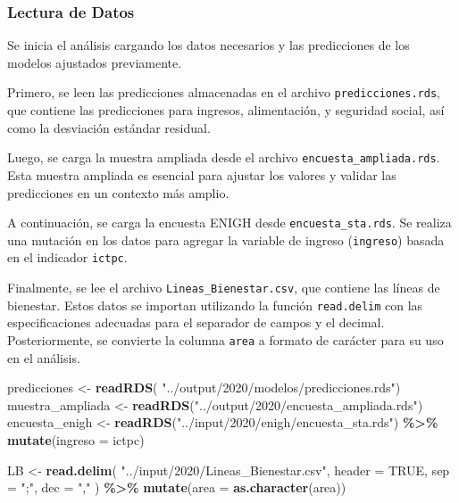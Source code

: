 \documentclass[
  12pt,
]{book}
\newenvironment{Shaded}{\begin{snugshade}}{\end{snugshade}}
\newcommand{\AttributeTok}[1]{\textcolor[rgb]{0.13,0.29,0.53}{#1}}
\newcommand{\ConstantTok}[1]{\textcolor[rgb]{0.56,0.35,0.01}{#1}}
\newcommand{\FunctionTok}[1]{\textcolor[rgb]{0.13,0.29,0.53}{\textbf{#1}}}
\newcommand{\NormalTok}[1]{#1}
\newcommand{\OtherTok}[1]{\textcolor[rgb]{0.56,0.35,0.01}{#1}}
\newcommand{\SpecialCharTok}[1]{\textcolor[rgb]{0.81,0.36,0.00}{\textbf{#1}}}
\newcommand{\StringTok}[1]{\textcolor[rgb]{0.31,0.60,0.02}{#1}}
\begin{document}
\hypertarget{lectura-de-datos-2}{%
\subsubsection*{Lectura de Datos}\label{lectura-de-datos-2}}

Se inicia el análisis cargando los datos necesarios y las predicciones de los modelos ajustados previamente.

Primero, se leen las predicciones almacenadas en el archivo \texttt{predicciones.rds}, que contiene las predicciones para ingresos, alimentación, y seguridad social, así como la desviación estándar residual.

Luego, se carga la muestra ampliada desde el archivo \texttt{encuesta\_ampliada.rds}. Esta muestra ampliada es esencial para ajustar los valores y validar las predicciones en un contexto más amplio.

A continuación, se carga la encuesta ENIGH desde \texttt{encuesta\_sta.rds}. Se realiza una mutación en los datos para agregar la variable de ingreso (\texttt{ingreso}) basada en el indicador \texttt{ictpc}.

Finalmente, se lee el archivo \texttt{Lineas\_Bienestar.csv}, que contiene las líneas de bienestar. Estos datos se importan utilizando la función \texttt{read.delim} con las especificaciones adecuadas para el separador de campos y el decimal. Posteriormente, se convierte la columna \texttt{area} a formato de carácter para su uso en el análisis.

\begin{Shaded}
\begin{Highlighting}[]
\NormalTok{predicciones }\OtherTok{\textless{}{-}} \FunctionTok{readRDS}\NormalTok{( }\StringTok{"../output/2020/modelos/predicciones.rds"}\NormalTok{)}
\NormalTok{muestra\_ampliada }\OtherTok{\textless{}{-}} \FunctionTok{readRDS}\NormalTok{(}\StringTok{"../output/2020/encuesta\_ampliada.rds"}\NormalTok{)}
\NormalTok{encuesta\_enigh }\OtherTok{\textless{}{-}} \FunctionTok{readRDS}\NormalTok{(}\StringTok{"../input/2020/enigh/encuesta\_sta.rds"}\NormalTok{) }\SpecialCharTok{\%\textgreater{}\%}
  \FunctionTok{mutate}\NormalTok{(}\AttributeTok{ingreso =}\NormalTok{ ictpc)}

\NormalTok{LB }\OtherTok{\textless{}{-}} \FunctionTok{read.delim}\NormalTok{(}
    \StringTok{"../input/2020/Lineas\_Bienestar.csv"}\NormalTok{,}
    \AttributeTok{header =} \ConstantTok{TRUE}\NormalTok{,}
    \AttributeTok{sep =} \StringTok{";"}\NormalTok{,}
    \AttributeTok{dec =} \StringTok{","}
\NormalTok{  ) }\SpecialCharTok{\%\textgreater{}\%} \FunctionTok{mutate}\NormalTok{(}\AttributeTok{area =} \FunctionTok{as.character}\NormalTok{(area))}
\end{Highlighting}
\end{Shaded}
\end{document}
